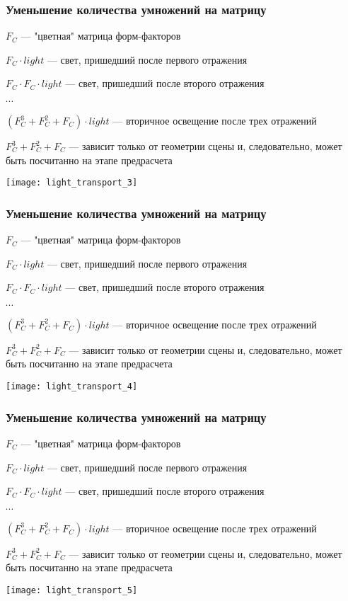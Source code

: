 \documentclass[unicode, dvipsnames]{beamer}
\begin{document}
\begin{frame}
	\frametitle{Уменьшение количества умножений на матрицу}
	$F_C$ --- "цветная" матрица форм-факторов
	
	$F_C \cdot light$ --- свет, пришедший после первого отражения

	$F_C \cdot F_C \cdot light$ --- свет, пришедший после второго отражения
	
	$\cdots$
	
	$(F_C^3 + F_C^2 + F_C) \cdot light$ --- вторичное освещение после трех отражений
	
	$F_C^3 + F_C^2 + F_C$ --- зависит только от геометрии сцены и, следовательно, может быть посчитанно на этапе предрасчета
	
	\center
	\texttt{[image: light\_transport\_3]}
\end{frame}

\begin{frame}
	\frametitle{Уменьшение количества умножений на матрицу}
	$F_C$ --- "цветная" матрица форм-факторов
	
	$F_C \cdot light$ --- свет, пришедший после первого отражения

	$F_C \cdot F_C \cdot light$ --- свет, пришедший после второго отражения
	
	$\cdots$
	
	$(F_C^3 + F_C^2 + F_C) \cdot light$ --- вторичное освещение после трех отражений
	
	$F_C^3 + F_C^2 + F_C$ --- зависит только от геометрии сцены и, следовательно, может быть посчитанно на этапе предрасчета
	
	\center
	\texttt{[image: light\_transport\_4]}
\end{frame}

\begin{frame}
	\frametitle{Уменьшение количества умножений на матрицу}
	$F_C$ --- "цветная" матрица форм-факторов
	
	$F_C \cdot light$ --- свет, пришедший после первого отражения

	$F_C \cdot F_C \cdot light$ --- свет, пришедший после второго отражения
	
	$\cdots$
	
	$(F_C^3 + F_C^2 + F_C) \cdot light$ --- вторичное освещение после трех отражений
	
	$F_C^3 + F_C^2 + F_C$ --- зависит только от геометрии сцены и, следовательно, может быть посчитанно на этапе предрасчета
	
	\center
	\texttt{[image: light\_transport\_5]}
\end{frame}
\end{document}

